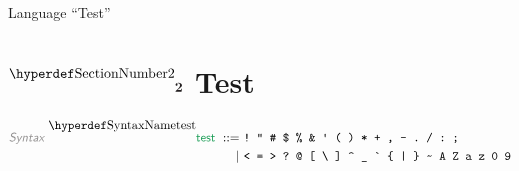 Language {}``Test{}''

\section*{$\SECTDECL{2}$ Test}\hypertarget{sectdecl2-test}{}\label{sectdecl2-test}

\begin{displaymath}
\relax\begin{aligned}\relax
  \KEY{Syntax} ~ 
     \SYNDECL{test}
      ~ ::= ~ &
      \LEX{!{}~"{}~\HASH ~\DOLLAR ~\PERCENT ~\AMPERSAND ~\APOSTROPHE ~(~)~*{}~+{}~,{}~-{}~.{}~/{}~:{}~;{}} \\
      ~ \mid ~ &  \LEX{<{}~={}~>{}~?{}~@{}~[{}~\BACKSLASH ~]{}~\CARET ~\UNDERSCORE ~\GRAVE ~\LEFTBRACE ~|~\RIGHTBRACE ~\TILDE ~A~Z~a~z~0~9}
\end{aligned}
\end{displaymath}

